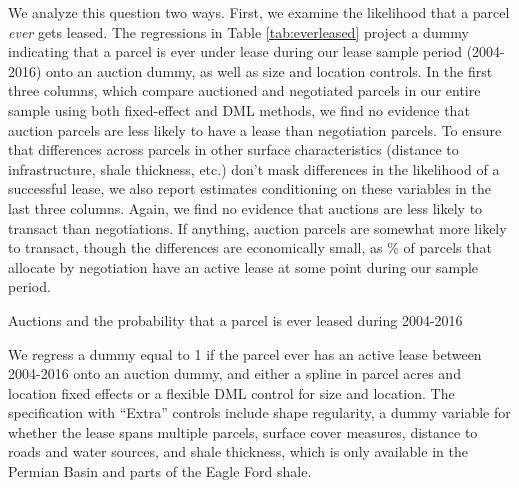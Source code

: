 \documentclass[12pt]{article}
\newcommand{\inputy}[1]{\unskip}
\begin{document}
We analyze this question two ways.  First, we examine the likelihood that a parcel \textit{ever} gets leased.  The regressions in Table \ref{tab:everleased} project a dummy indicating that a parcel is ever under lease during our lease sample period (2004-2016) onto an auction dummy, as well as size and location controls. In the first three columns, which compare auctioned and negotiated parcels in our entire sample using both fixed-effect and DML methods, we find no evidence that auction parcels are less likely to have a lease than negotiation parcels. To ensure that differences across parcels in other surface characteristics (distance to infrastructure, shale thickness, etc.) don't mask differences in the likelihood of a successful lease, we also report estimates conditioning on these variables in the last three columns.  Again, we find no evidence that auctions are less likely to transact than negotiations.  If anything, auction parcels are somewhat more likely to transact, though the differences are economically small, as \inputy{../output/estimates/negotiation_ever_leased.tex}\% of parcels that allocate by negotiation have an active lease at some point during our sample period. 

\addtolength{\tabcolsep}{4pt}
\begin{table}[H]
\begin{center}
\begin{threeparttable}
	\caption{Auctions and the probability that a parcel is ever leased during 2004-2016}
	\label{tab:everleased}
 	\small
   	            
    \footnotesize
    \begin{tablenotes}
    	\item We regress a dummy equal to 1 if the parcel ever has an active lease between 2004-2016 onto an auction dummy, and either a spline in parcel acres and location fixed effects or a flexible DML control for size and location.  The specification with ``Extra'' controls include shape regularity, a dummy variable for whether the lease spans multiple parcels, surface cover measures, distance to roads and water sources, and shale thickness, which is only available in the Permian Basin and parts of the Eagle Ford shale.  
    \end{tablenotes}
\end{threeparttable}
\end{center}
\end{table}
\addtolength{\tabcolsep}{-4pt}
\end{document}
